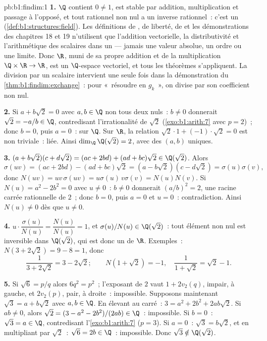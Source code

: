 \begin{solution}{pb:b1:findim:1}
\textbf{1.} $\Q$ contient $0 \neq 1$, est stable par addition,
multiplication et passage à l'opposé, et tout rationnel non nul a un
inverse rationnel~: c'est un 
(\cref{def:b1:structures:field}). Les définitions de , de liberté, de  et les démonstrations des chapitres 18
et 19 n'utilisent que l'addition vectorielle, la distributivité et
l'arithmétique des scalaires dans un  --- jamais une valeur
absolue, un ordre ou une limite. Donc $\R$, muni de sa propre addition
et de la multiplication $\Q \times \R \to \R$, est un $\Q$-espace
vectoriel, et tous les théorèmes s'appliquent. La division par un
scalaire intervient une seule fois dans la démonstration du
\cref{thm:b1:findim:exchange}~: pour «~résoudre en $g_k$~», on divise
par son coefficient non nul.

\textbf{2.} Si $a + b\sqrt2 = 0$ avec $a, b \in \Q$ non tous deux
nuls~: $b \neq 0$ donnerait $\sqrt2 = -a/b \in \Q$, contredisant
l'irrationalité de $\sqrt2$ (\cref{exo:b1:arith:7} avec $p =
2$)~; donc $b = 0$, puis $a = 0$~:  sur $\Q$. Sur $\R$, la
relation $\sqrt2\cdot 1 + (-1)\cdot\sqrt2 = 0$ est non triviale~:
liée. Ainsi $\dim_\Q \Q(\sqrt2) = 2$, avec des  $(a, b)$
uniques.

\textbf{3.} $(a + b\sqrt2)(c + d\sqrt2) = (ac + 2bd) + (ad +
bc)\sqrt2 \in \Q(\sqrt2)$. Alors
\[
\sigma(uv) = (ac + 2bd) - (ad + bc)\sqrt2
= (a - b\sqrt2)(c - d\sqrt2) = \sigma(u)\sigma(v),
\]
donc $N(uv) = uv\,\sigma(uv) = u\sigma(u)\,v\sigma(v) = N(u)N(v)$.
Si $N(u) = a^2 - 2b^2 = 0$ avec $u \neq 0$~: $b \neq 0$ donnerait
$(a/b)^2 = 2$, une racine carrée rationnelle de $2$~; donc $b = 0$,
puis $a = 0$ et $u = 0$~: contradiction. Ainsi $N(u) \neq 0$ dès que
$u \neq 0$.

\textbf{4.} $u \cdot \dfrac{\sigma(u)}{N(u)} = \dfrac{N(u)}{N(u)}
= 1$, et $\sigma(u)/N(u) \in \Q(\sqrt2)$~: tout élément non nul est
inversible dans $\Q(\sqrt2)$, qui est donc un  de $\R$.
Exemples~: $N(3 + 2\sqrt2) = 9 - 8 = 1$, donc
\[
\frac1{3 + 2\sqrt2} = 3 - 2\sqrt2 ;
\qquad
N(1 + \sqrt2) = -1, \quad
\frac1{1 + \sqrt2} = \sqrt2 - 1 .
\]

\textbf{5.} Si $\sqrt6 = p/q$ alors $6q^2 = p^2$~; l'exposant de
$2$ vaut $1 + 2v_2(q)$, impair, à gauche, et $2v_2(p)$, pair, à
droite~: impossible. Supposons maintenant $\sqrt3 = a + b\sqrt2$ avec
$a, b \in \Q$. En élevant au carré~: $3 = a^2 + 2b^2 + 2ab\sqrt2$. Si
$ab \neq 0$, alors $\sqrt2 = (3 - a^2 - 2b^2)/(2ab) \in \Q$~:
impossible. Si $b = 0$~: $\sqrt3 = a \in \Q$, contredisant
l'\cref{exo:b1:arith:7} ($p = 3$). Si $a = 0$~: $\sqrt3 = b\sqrt2$,
et en multipliant par $\sqrt2$~: $\sqrt6 = 2b \in \Q$~: impossible.
Donc $\sqrt3 \notin \Q(\sqrt2)$.


\end{solution}

